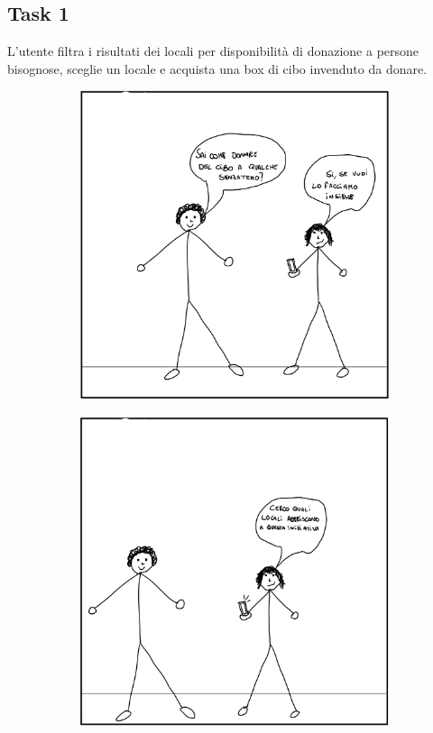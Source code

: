 \documentclass{article}
\begin{document}
\subsection{Task 1}
L’utente filtra i risultati dei locali per disponibilità di donazione a persone bisognose, sceglie un locale e acquista una box di cibo invenduto da donare.
\begin{figure}[H]
    \centering
    \begin{subfigure}{0.25\textwidth}
        \centering
        \includegraphics[width=\textwidth]{Storyboard/task1-img/t1.1.png}
    \end{subfigure}
    \hspace{0.02\textwidth}
    \begin{subfigure}{0.25\textwidth}
        \centering
        \includegraphics[width=\textwidth]{Storyboard/task1-img/t1.2.png}

\end{subfigure}
\end{figure}
\end{document}

